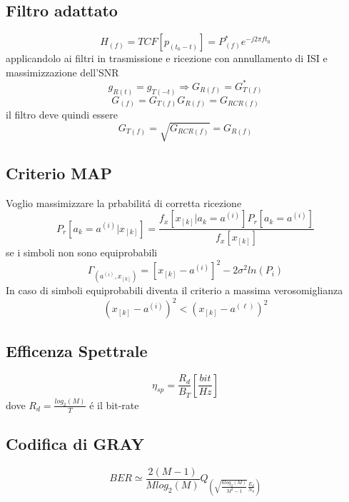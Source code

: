     \subsection{Filtro adattato}
        \[
            H_{(f)} = TCF[p_{(t_0-t)}] = P^*_{(f)}e^{-j2\pi ft_0}    
        \]
        applicandolo ai filtri in trasmissione e ricezione con annullamento di ISI e massimizzazione dell'SNR
        \[
            g_{R(t)} = g_{T(-t)} \Rightarrow G_{R(f)} = G_{T(f)}^\ast
        \]
        \[
            G_{(f)} = G_{T(f)} G_{R(f)} = G_{RCR(f)} 
        \]
        il filtro deve quindi essere
        \[
            G_{T(f)} = \sqrt{G_{RCR(f)}} = G_{R(f)}    
        \] 
    \subsection{Criterio MAP}
        Voglio massimizzare la prbabilitá di 
        corretta ricezione 
        \[
            P_r[a_k = a^{(i)}|x_{[k]}] = \frac{f_x[x_{[k]}|a_k = a^{(i)}]P_r[a_k = a^{(i)}]}{f_x[x_{[k]}]}    
        \]
        se i simboli non sono equiprobabili
        \[
            \Gamma_{(a^{(i)},x_{[k]})} = \left[x_{[k]}-a^{(i)}\right]^2-2\sigma^2ln(P_i)
        \]
        In caso di simboli equiprobabili diventa il criterio a massima verosomiglianza
        \[
            \left(x_{[k]}-a^{(i)}\right)^2<\left(x_{[k]}-a^{(\ell)}\right)^2  
        \]
    \subsection{Efficenza Spettrale}
        \[
            \eta_{sp} = \frac{R_d}{B_T} [\frac{bit}{Hz}]    
        \]
        dove $R_d=\frac{log_2(M)}{T}$ é il bit-rate
    \subsection{Codifica di GRAY}
        \[
            BER \simeq \frac{2(M-1)}{Mlog_2(M)}Q_{\displaystyle \left(\sqrt{\frac{6log_2(M)}{M^2-1}}\frac{E_d}{N_0}\right)}    
        \] 
